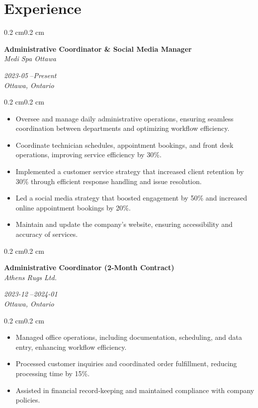 \documentclass[10pt, letterpaper]{article}
\newenvironment{highlights}{%
    \begin{itemize}[
        topsep=0.10 cm,%
        parsep=0.10 cm,%
        partopsep=0pt,%
        itemsep=0pt,%
        leftmargin=0.4 cm + 10pt%
    ]
}{%
    \end{itemize}%
}
\newenvironment{onecolentry}{%
    \begin{adjustwidth}{0.2 cm}{0.2 cm}%
}{%
    \end{adjustwidth}%
}
\newenvironment{twocolentry}[1]{%
    \begin{onecolentry}%
    \def\twocolentryarg{#1}%
    \noindent
    \begin{minipage}[t]{0.68\textwidth} %
}{%
    \end{minipage}\hfill%
    \begin{minipage}[t]{0.30\textwidth} %
      \raggedleft\twocolentryarg
    \end{minipage}%
    \vspace{0.2cm}%
    \end{onecolentry}%
}
\begin{document}
\section{Experience}
\begin{twocolentry}{%
\textit{2023-05 }--\textit{Present} \\[0.1cm]
\textit{Ottawa, Ontario}%
}
    \textbf{Administrative Coordinator \& Social Media Manager }\\
    \textit{Medi Spa Ottawa }
\end{twocolentry}
\vspace{0.10 cm}
\begin{onecolentry}
    \begin{highlights}
        \item Oversee and manage daily administrative operations, ensuring seamless coordination between departments and optimizing workflow efficiency.
        \item Coordinate technician schedules, appointment bookings, and front desk operations, improving service efficiency by 30\%.
        \item Implemented a customer service strategy that increased client retention by 30\% through efficient response handling and issue resolution.
        \item Led a social media strategy that boosted engagement by 50\% and increased online appointment bookings by 20\%.
        \item Maintain and update the company’s website, ensuring accessibility and accuracy of services.
    \end{highlights}
\end{onecolentry}
\vspace{0.2 cm}
\begin{twocolentry}{%
\textit{2023-12 }--\textit{2024-01} \\[0.1cm]
\textit{Ottawa, Ontario}%
}
    \textbf{Administrative Coordinator (2-Month Contract) }\\
    \textit{Athens Rugs Ltd. }
\end{twocolentry}
\vspace{0.10 cm}
\begin{onecolentry}
    \begin{highlights}
        \item Managed office operations, including documentation, scheduling, and data entry, enhancing workflow efficiency.
        \item Processed customer inquiries and coordinated order fulfillment, reducing processing time by 15\%.
        \item Assisted in financial record-keeping and maintained compliance with company policies.
    \end{highlights}
\end{onecolentry}
\end{document}
